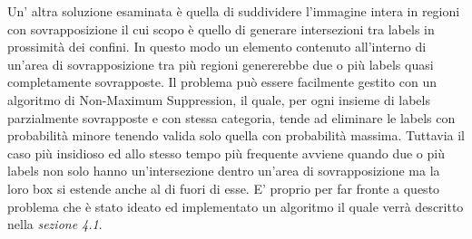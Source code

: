 Un' altra soluzione esaminata è quella di suddividere l'immagine intera in regioni con sovrapposizione il cui scopo è quello di generare intersezioni tra labels in prossimità dei confini. In questo modo un elemento contenuto all'interno di un'area di sovrapposizione tra più regioni genererebbe due o più labels quasi completamente sovrapposte. Il problema può essere facilmente gestito con un algoritmo di Non-Maximum Suppression, il quale, per ogni insieme di labels parzialmente sovrapposte e con stessa categoria, tende ad eliminare le labels con probabilità minore tenendo valida solo quella con probabilità massima. Tuttavia il caso più insidioso ed allo stesso tempo più frequente avviene quando due o più labels non solo hanno un'intersezione dentro un'area di sovrapposizione ma la loro box si estende anche al di fuori di esse. E' proprio per far fronte a questo problema che è stato ideato ed implementato un algoritmo il quale verrà descritto nella \textit{sezione 4.1}.
